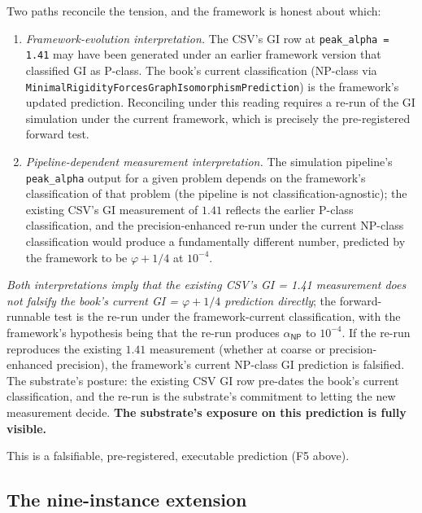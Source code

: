 \documentclass[11pt,a4paper]{amsart}
\theoremstyle{plain}
\theoremstyle{definition}
\begin{document}
Two paths reconcile the tension, and the framework is honest about which:
\begin{enumerate}[itemsep=2pt,leftmargin=2em]
\item \emph{Framework-evolution interpretation.} The CSV's GI row at \texttt{peak\_alpha = 1.41} may have been generated under an earlier framework version that classified GI as P-class. The book's current classification (NP-class via \texttt{MinimalRigidityForcesGraphIsomorphismPrediction}) is the framework's updated prediction. Reconciling under this reading requires a re-run of the GI simulation under the current framework, which is precisely the pre-registered forward test.
\item \emph{Pipeline-dependent measurement interpretation.} The simulation pipeline's \texttt{peak\_alpha} output for a given problem depends on the framework's classification of that problem (the pipeline is not classification-agnostic); the existing CSV's GI measurement of $1.41$ reflects the earlier P-class classification, and the precision-enhanced re-run under the current NP-class classification would produce a fundamentally different number, predicted by the framework to be $\varphi + 1/4$ at $10^{-4}$.
\end{enumerate}
\emph{Both interpretations imply that the existing CSV's GI = 1.41 measurement does not falsify the book's current GI = $\varphi + 1/4$ prediction directly}; the forward-runnable test is the re-run under the framework-current classification, with the framework's hypothesis being that the re-run produces $\alpha_{\textsf{NP}}$ to $10^{-4}$. If the re-run reproduces the existing $1.41$ measurement (whether at coarse or precision-enhanced precision), the framework's current NP-class GI prediction is falsified. The substrate's posture: the existing CSV GI row pre-dates the book's current classification, and the re-run is the substrate's commitment to letting the new measurement decide. \textbf{The substrate's exposure on this prediction is fully visible.}

This is a falsifiable, pre-registered, executable prediction (F5 above).

\subsection{The nine-instance extension}
\end{document}
